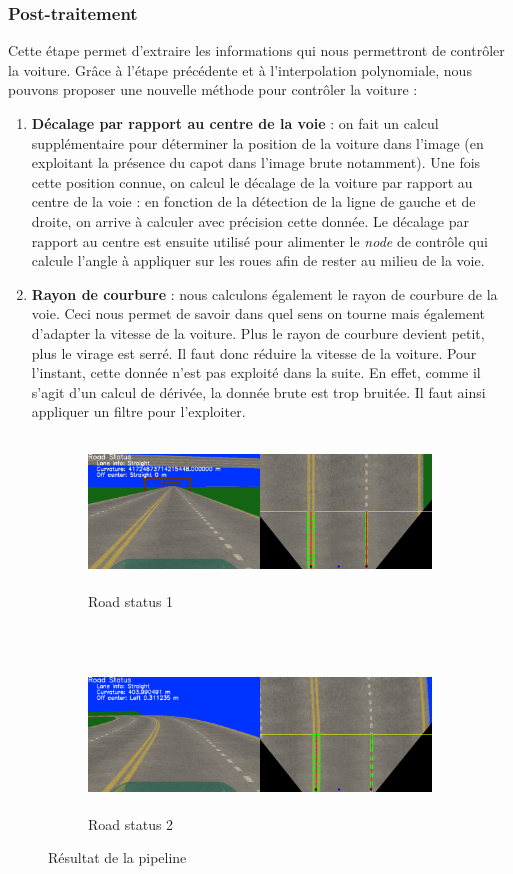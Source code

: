 \documentclass[12pt, openany]{report}
\begin{document}
\subsubsection{Post-traitement}
Cette étape permet d'extraire les informations qui nous permettront de contrôler la voiture. Grâce à l'étape précédente et à l'interpolation polynomiale, nous pouvons proposer une nouvelle méthode pour contrôler la voiture :  
\begin{enumerate}
    \item \textbf{Décalage par rapport au centre de la voie} : on fait un calcul supplémentaire pour déterminer la position de la voiture dans l'image (en exploitant la présence du capot dans l'image brute notamment). Une fois cette position connue, on calcul le décalage de la voiture par rapport au centre de la voie : en fonction de la détection de la ligne de gauche et de droite, on arrive à calculer avec précision cette donnée. Le décalage par rapport au centre est ensuite utilisé pour alimenter le \textit{node} de contrôle qui calcule l'angle à appliquer sur les roues afin de rester au milieu de la voie.
    \item \textbf{Rayon de courbure} : nous calculons également le rayon de courbure de la voie. Ceci nous permet de savoir dans quel sens on tourne mais également d'adapter la vitesse de la voiture. Plus le rayon de courbure devient petit, plus le virage est serré. Il faut donc réduire la vitesse de la voiture. Pour l'instant, cette donnée n'est pas exploité dans la suite. En effet, comme il s'agit d'un calcul de dérivée, la donnée brute est trop bruitée. Il faut ainsi appliquer un filtre pour l'exploiter.
\end{enumerate}
\begin{figure}[H]
     \centering
     \begin{subfigure}[b]{\textwidth}
         \centering
         \includegraphics[width=\textwidth, height = 4cm]{visual.png}
         \caption{Road status 1}
     \end{subfigure}
     \\
     \begin{subfigure}[b]{\textwidth}
         \centering
         \includegraphics[width=\textwidth, height = 4cm]{visualoffG.png}
         \caption{Road status 2}
     \end{subfigure}
     \caption{Résultat de la pipeline}
     \label{fig:res}     
\end{figure}
\end{document}
